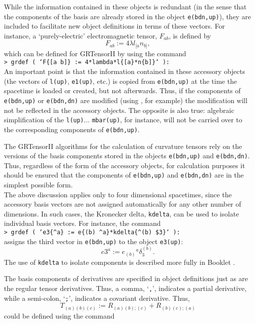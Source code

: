 \documentclass{article}
\begin{document}
While the information contained in these objects is redundant (in the
sense that the components of the basis are already stored in the
object \texttt{e(bdn,up)}), they are included to facilitate new object
definitions in terms of these vectors. For instance, a
`purely-electric' electromagnetic tensor, $F_{ab}$, is defined by
\[
  F_{ab} := 4 \lambda l_{[a} n_{b]},
\]
which can be defined for GRTensorII by using the command\\

\noindent\texttt{> grdef ( `F\{[a b]\} := 4*lambda*l\{[a\}*n\{b]\}` ):}\\

An important point is that the information contained in these
accessory objects (the vectors of \texttt{l(up)}, \texttt{e1(up)},
etc.) is copied from \texttt{e(bdn,up)} at the time the spacetime is
loaded or created, but not afterwards. Thus, if the components of
\texttt{e(bdn,up)} or \texttt{e(bdn,dn)} are modified (using
, for example) the modification will not be reflected
in the accessory objects. The opposite is also true: algebraic
simplification of the \texttt{l(up)}$\ldots$ \texttt{mbar(up)}, for
instance, will not be carried over to the corresponding components of
\texttt{e(bdn,up)}.

The GRTensorII algorithms for the calculation of curvature tensors
rely on the versions of the basis components stored in the objects
\texttt{e(bdn,up)} and \texttt{e(bdn,dn)}. Thus, regardless of the
form of the accessory objects, for calculation purposes it should be
ensured that the components of \texttt{e(bdn,up)} and
\texttt{e(bdn,dn)} are in the simplest possible form.\\

The above discussion applies only to four dimensional spacetimes,
since the accessory basis vectors are not assigned automatically for any other
number of dimensions. In such cases, the Kronecker delta,
\texttt{kdelta}, can be used to isolate individual basis vectors.
For instance, the command\\

\noindent\texttt{> grdef (
  `e3\{\^{}a\} := e\{(b) \^{}a\}*kdelta\{\^{}(b) \$3\}` ):}\\

\noindent assigns the third vector in \texttt{e(bdn,up)} to the object
\texttt{e3(up)}:
\[
  e3^a := e_{(b)}{}^a \delta^{(b)}_3.
\]
The use of \texttt{kdelta} to isolate components is described more
fully in Booklet \grDefRef.

The basis components of derivatives are specified in object
definitions just as are the regular tensor derivatives. Thus, a comma,
`\texttt{,}', indicates a partial derivative, while a semi-colon,
`\texttt{;}', indicates a covariant derivative. Thus,
\[
  T_{(a)(b)(c)} := R_{(a)(b);(c)} + R_{(b)(c);(a)}
\]
could be defined using the command\\
\end{document}
